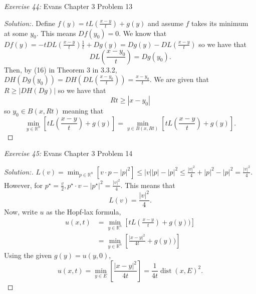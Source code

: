 \documentclass{article}
\newcommand{\exercise}[2]{
\vspace{0.2in}\begin{mdframed}[
  backgroundcolor=problem,
  skipabove=\topsep,
  skipbelow=\topsep
  ]
  \emph{Exercise {#1}:} {#2}
\end{mdframed}}
\newcommand{\R}{\mathbb{R}}
\begin{document}
    \exercise{44}{Evans Chapter 3 Problem 13}
    \begin{proof}[Solution:]
      Define $f(y) = tL(\frac{x-y}{t}) + g(y)$ and assume $f$ takes its minimum at some $y_0$. This means $Df(y_0) = 0$. We know that $Df(y) = -tDL(\frac{x-y}{t})\frac{1}{t} + Dg(y) = Dg(y) - DL(\frac{x-y}{t})$ so we have that 
      \[DL(\frac{x-y_0}{t}) = Dg(y_0).\] Then, by (16) in Theorem 3 in 3.3.2, $DH(Dg(y_0)) = DH(DL(\frac{x-y_0}{t}))=\frac{x - y_0}{t}$. We are given that $R \ge |DH(Dg)|$ so we have that 
      \[Rt \ge |x-y_0|\]
      so $y_0 \in B(x,Rt)$ meaning that 
      \[\min_{y\in\R^n} \left[tL(\frac{x-y}{t}) + g(y)\right] = \min_{y\in B(x,Rt)}\left[tL(\frac{x-y}{t}) + g(y)\right].\]

    \end{proof}
    \exercise{45}{Evans Chapter 3 Problem 14}
    \begin{proof}[Solution:]
      $L(v) = \min_{p\in\R^n} [v\cdot p - |p|^2] \le |v||p| - |p|^2 \le \frac{|v|^2}{4} + |p|^2 - |p|^2 = \frac{|v|^2}{4}.$ However, for $p^\star = \frac{v}{2}, p^\star \cdot v - |p^\star|^2 = \frac{|v|^2}{4}$. This means that 
      \[L(v) = \frac{|v|^2}{4}.\]
      Now, write $u$ as the Hopf-lax formula, 
      \begin{align*}
        u(x,t) &= \min_{y\in\R^n} \left[tL(\frac{x-y}{t}) + g(y))\right]\\
        &= \min_{y\in\R^n} \left[\frac{|x-y|^2}{4t} + g(y))\right]
      \end{align*}
      Using the given $g(y) = u(y,0)$, 
      \[ u(x,t) = \min_{y\in E} \left[\frac{|x-y|^2}{4t}\right] = \frac{1}{4t}\operatorname{dist}(x,E)^2.\]
    \end{proof}  
    
\end{document}
